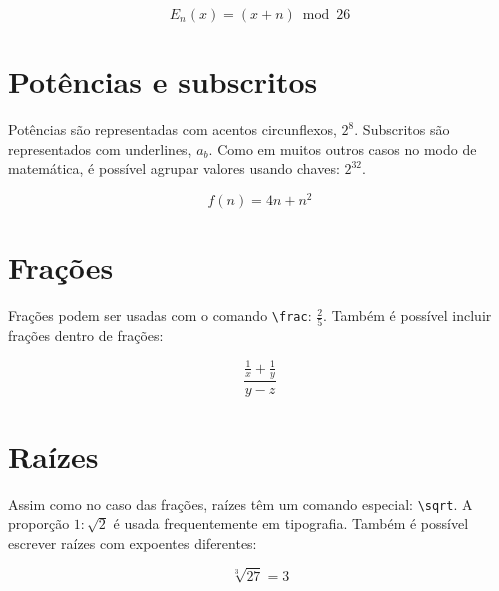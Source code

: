 \documentclass[a4paper,oneside]{article}
\begin{document}
\begin{equation}
  E_n(x) = (x + n) \bmod 26
  \tag{Cifra de César}
\end{equation}

\section{Potências e subscritos}

Potências são representadas com acentos circunflexos, \( 2^8 \). Subscritos são
representados com underlines, \( a_b \). Como em muitos outros casos no modo de
matemática, é possível agrupar valores usando chaves: \( 2^{32} \).

\[ f(n) = 4n + n^2 \]

\section{Frações}

Frações podem ser usadas com o comando \verb+\frac+: \( \frac{2}{5} \). Também é possível incluir frações dentro de frações:

\[ \frac{\frac{1}{x}+\frac{1}{y}}{y-z} \]

\section{Raízes}

Assim como no caso das frações, raízes têm um comando especial: \verb+\sqrt+.
A proporção \( 1:\sqrt{2} \) é usada frequentemente em tipografia. Também é possível escrever raízes com expoentes diferentes:

\[ \sqrt[3]{27} = 3 \]
\end{document}
